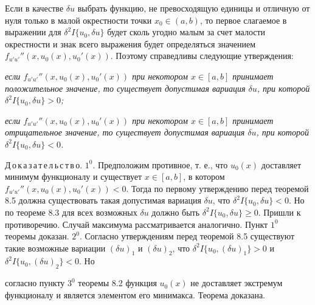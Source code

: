 	Если в качестве $\delta u$ выбрать функцию, не превосходящую единицы и отличную от нуля только в малой окрестности точки $x_0\in (a, b)$, то первое слагаемое в выражении для $\delta^2 I\{u_0,\delta u\}$ будет сколь угодно малым за счет малости окрестности и знак всего выражения будет определяться значением $f_{u'u'}''(x, u_0(x), u_0'(x))$. Поэтому справедливы следующие утверждения:

	\vspace{3mm}
	{\it если $f_{u'u'}''(x, u_0(x), u_0'(x))$ при некотором $x\in [a, b]$ принимает положительное значение, то существует допустимая вариация $\delta u$, при которой $\delta^2 I\{u_0,\delta u\}>0$;}

	{\it если $f_{u'u'}''(x, u_0(x), u_0'(x))$ при некотором $x\in [a, b]$ принимает отрицательное значение, то существует допустимая вариация $\delta u$, при которой $\delta^2 I\{u_0,\delta u\}<0$.}

	\vspace{3mm}

	\vspace{3mm}
	Д\,о\,к\,а\,з\,а\,т\,е\,л\,ь\,с\,т\,в\,о. \quad $1^0$. Предположим противное, т. е., что $u_0(x)$ доставляет минимум функционалу и существует $x\in [a,b]$, в котором \hfill $f_{u'u'}''(x, u_0(x), u_0'(x)) < 0$. Тогда по первому утверждению перед теоремой 8.5 должна существовать такая допустимая вариация $\delta u$, что $\delta^2 I\{u_0,\delta u\}<0$. Но по теореме 8.3 для всех возможных $\delta u$ должно быть $\delta^2 I\{u_0,\delta u\}\geq 0$. Пришли к противоречию. Случай максимума рассматривается аналогично. Пункт $1^0$ теоремы доказан. $2^0$. Согласно утверждениям перед теоремой 8.5 существуют такие возможные вариации $(\delta u)_1$ и $(\delta u)_2$, что $\delta^2 I\{u_0,(\delta u)_1\}>0$ и $\delta^2 I\{u_0,(\delta u)_2\}<0$. Но

	\newpage
	\noindent
	согласно пункту $3^0$ теоремы 8.2 функция $u_0(x)$ не доставляет экстремум функционалу и является элементом его минимакса. Теорема доказана.

